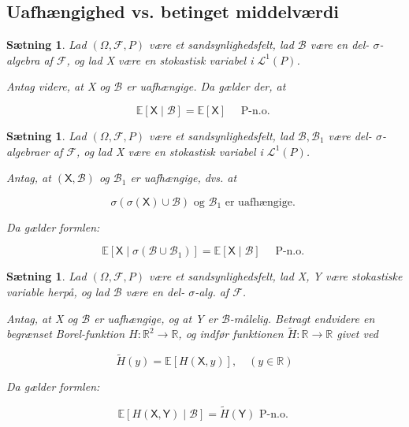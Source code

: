 \documentclass{article}
\newcommand{\1}{\mathbbm{1}}
\newcommand{\X}{\mathsf{X}}
\newcommand{\Y}{\mathsf{Y}}
\theoremstyle{boxed}
\newtheorem{proposition}[theorem]{Sætning}
\begin{document}
\subsection{Uafhængighed vs. betinget middelværdi}
\begin{theorem-box}
    \begin{proposition}
        Lad $(\Omega, \mathcal{F}, P)$ være et sandsynlighedsfelt, lad $\mathcal{B}$ være en del- $\sigma$-algebra af $\mathcal{F}$, og lad X være en stokastisk variabel i $\mathcal{L}^1(P)$.

Antag videre, at X og $\mathcal{B}$ er uafhængige.
Da gælder der, at

$$
\mathbb{E}[\X \mid \mathcal{B}]=\mathbb{E}[\X] \quad \text { P-n.o. }
$$

    \end{proposition}
\end{theorem-box}
\begin{theorem-box}
    \begin{proposition}
        Lad $(\Omega, \mathcal{F}, P)$ være et sandsynlighedsfelt, lad $\mathcal{B}, \mathcal{B}_1$ være del- $\sigma$-algebraer af $\mathcal{F}$, og lad X være en stokastisk variabel i $\mathcal{L}^1(P)$.

Antag, at $(\X, \mathcal{B})$ og $\mathcal{B}_1$ er uafhængige, dvs. at

$$
\sigma(\sigma(\X) \cup \mathcal{B}) \text { og } \mathcal{B}_1 \text { er uafhængige. }
$$


Da gælder formlen:

$$
\mathbb{E}\left[\X \mid \sigma\left(\mathcal{B} \cup \mathcal{B}_1\right)\right]=\mathbb{E}[\X \mid \mathcal{B}] \quad \text { P-n.o. }
$$

    \end{proposition}
\end{theorem-box}
\begin{theorem-box}
    \begin{proposition}
        Lad $(\Omega, \mathcal{F}, P)$ være et sandsynlighedsfelt, lad X, Y være stokastiske variable herpå, og lad $\mathcal{B}$ være en del- $\sigma$-alg. af $\mathcal{F}$.

Antag, at X og $\mathcal{B}$ er uafhængige, og at Y er $\mathcal{B}$-målelig.
Betragt endvidere en begrænset Borel-funktion $H: \mathbb{R}^2 \rightarrow \mathbb{R}$, og indfør funktionen $\tilde{H}: \mathbb{R} \rightarrow \mathbb{R}$ givet ved

$$
\tilde{H}(y)=\mathbb{E}[H(\X, y)], \quad(y \in \mathbb{R})
$$


Da gælder formlen:

$$
\mathbb{E}[H(\X, \Y) \mid \mathcal{B}]=\tilde{H}(\Y) \text { P-n.o. }
$$

    \end{proposition}
\end{theorem-box} 
\end{document}
